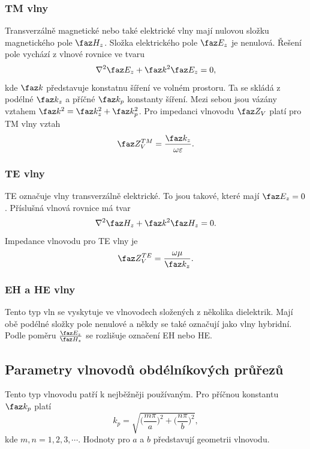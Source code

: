 \subsubsection*{TM vlny}
Transverzálně magnetické nebo také elektrické vlny mají nulovou složku magnetického pole $\faz H_{z}$. Složka elektrického pole $\faz E_{z}$ je nenulová. Řešení pole vychází z vlnové rovnice ve tvaru
\begin{displaymath}
	\nabla^{2} \faz E_{z} + \faz k^{2}\faz E_{z} = 0,
\end{displaymath}
kde $\faz k$ představuje konstatnu šíření ve volném prostoru. Ta se skládá z podélné $\faz k_z$ a příčné $\faz k_p$ konstanty šíření. Mezi sebou jsou vázány vztahem $\faz k^{2} = \faz k_z^{2} + \faz k_p^{2}$. Pro impedanci vlnovodu $\faz Z_{V}$ platí pro TM vlny vztah
\begin{displaymath}
   \faz Z_{V}^{TM} = \frac{\faz k_z}{\omega\varepsilon}.
\end{displaymath}

\subsubsection*{TE vlny}
TE označuje vlny transverzálně elektrické. To jsou takové, které mají $\faz E_{z} = 0$. Příslušná vlnová rovnice má tvar
\begin{displaymath}
	\nabla^{2} \faz H_{z} + \faz k^{2}\faz H_{z} = 0.
\end{displaymath}
Impedance vlnovodu pro TE vlny je
\begin{displaymath}
	\faz Z_{V}^{TE} = \frac{\omega\mu}{\faz k_z}.
\end{displaymath} 
\subsubsection*{EH a HE vlny}
Tento typ vln se vyskytuje ve vlnovodech složených z několika dielektrik. Mají obě podélné složky pole nenulové a někdy se také označují jako vlny hybridní. Podle poměru $\frac{\faz E_z}{\faz H_z}$ se rozlišuje označení EH nebo HE.

\subsection{Parametry vlnovodů obdélníkových průřezů}
Tento typ vlnovodu patří k nejběžněji používaným. 
Pro příčnou konstantu $\faz k_p$ platí 
\begin{displaymath}
	k_p = \sqrt{\bigg(\frac{m\pi}{a}\bigg)^{2} + \bigg(\frac{n\pi}{b}\bigg)^{2}},
\end{displaymath}
kde $m, n = 1, 2, 3,\cdots$. Hodnoty pro $a$ a $b$ představují geometrii vlnovodu.

